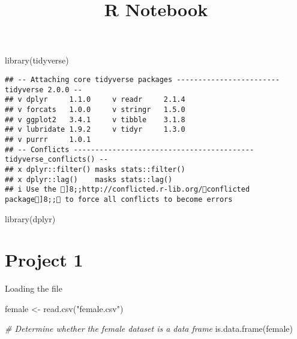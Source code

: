 \documentclass[
]{article}
\title{R Notebook}
\author{}
\date{\vspace{-2.5em}}
\newenvironment{Shaded}{\begin{snugshade}}{\end{snugshade}}
\newcommand{\CommentTok}[1]{\textcolor[rgb]{0.56,0.35,0.01}{\textit{#1}}}
\newcommand{\FunctionTok}[1]{\textcolor[rgb]{0.00,0.00,0.00}{#1}}
\newcommand{\NormalTok}[1]{#1}
\newcommand{\OtherTok}[1]{\textcolor[rgb]{0.56,0.35,0.01}{#1}}
\newcommand{\StringTok}[1]{\textcolor[rgb]{0.31,0.60,0.02}{#1}}
\begin{document}
\maketitle

\begin{Shaded}
\begin{Highlighting}[]
\FunctionTok{library}\NormalTok{(tidyverse)}
\end{Highlighting}
\end{Shaded}

\begin{verbatim}
## -- Attaching core tidyverse packages ------------------------ tidyverse 2.0.0 --
## v dplyr     1.1.0     v readr     2.1.4
## v forcats   1.0.0     v stringr   1.5.0
## v ggplot2   3.4.1     v tibble    3.1.8
## v lubridate 1.9.2     v tidyr     1.3.0
## v purrr     1.0.1     
## -- Conflicts ------------------------------------------ tidyverse_conflicts() --
## x dplyr::filter() masks stats::filter()
## x dplyr::lag()    masks stats::lag()
## i Use the ]8;;http://conflicted.r-lib.org/conflicted package]8;; to force all conflicts to become errors
\end{verbatim}

\begin{Shaded}
\begin{Highlighting}[]
\FunctionTok{library}\NormalTok{(dplyr)}
\end{Highlighting}
\end{Shaded}

\hypertarget{project-1}{%
\section{Project 1}\label{project-1}}

Loading the file

\begin{Shaded}
\begin{Highlighting}[]
\NormalTok{female }\OtherTok{\textless{}{-}} \FunctionTok{read.csv}\NormalTok{(}\StringTok{"female.csv"}\NormalTok{)}
\end{Highlighting}
\end{Shaded}

\begin{Shaded}
\begin{Highlighting}[]
\CommentTok{\# Determine whether the female dataset is a data frame}
\FunctionTok{is.data.frame}\NormalTok{(female)}
\end{Highlighting}
\end{Shaded}
\end{document}
